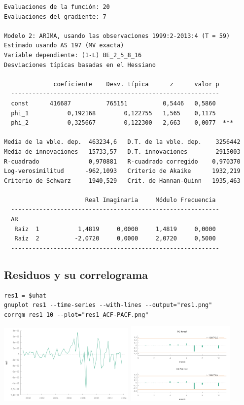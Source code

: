 \documentclass[10pt]{article}
\begin{document}
\begin{verbatim}
Evaluaciones de la función: 20
Evaluaciones del gradiente: 7

Modelo 2: ARIMA, usando las observaciones 1999:2-2013:4 (T = 59)
Estimado usando AS 197 (MV exacta)
Variable dependiente: (1-L) BE_2_5_8_16
Desviaciones típicas basadas en el Hessiano

              coeficiente    Desv. típica      z      valor p
  -----------------------------------------------------------
  const      416687          765151          0,5446   0,5860 
  phi_1           0,192168        0,122755   1,565    0,1175 
  phi_2           0,325667        0,122300   2,663    0,0077  ***

Media de la vble. dep.  463234,6   D.T. de la vble. dep.    3256442
Media de innovaciones  -15733,57   D.T. innovaciones        2915003
R-cuadrado              0,970881   R-cuadrado corregido    0,970370
Log-verosimilitud      -962,1093   Criterio de Akaike      1932,219
Criterio de Schwarz     1940,529   Crit. de Hannan-Quinn   1935,463

                       Real Imaginaria     Módulo Frecuencia
  -----------------------------------------------------------
  AR
   Raíz  1           1,4819     0,0000     1,4819     0,0000
   Raíz  2          -2,0720     0,0000     2,0720     0,5000
  -----------------------------------------------------------
\end{verbatim}
\subsection*{Residuos y su correlograma}
\label{sec:org536f78d}

\begin{verbatim}
res1 = $uhat
gnuplot res1 --time-series --with-lines --output="res1.png"
corrgm res1 10 --plot="res1_ACF-PACF.png"
\end{verbatim}

\begin{center}
\includegraphics[width=0.5\textwidth]{./SerieCuentasFinancierasBE/res1.png} 
\includegraphics[width=0.4\textwidth]{./SerieCuentasFinancierasBE/res1_ACF-PACF.png}
\end{center}
\end{document}

